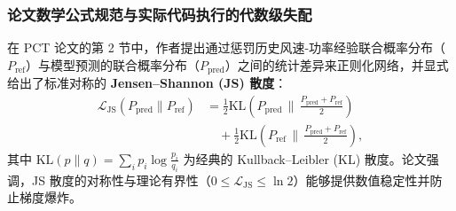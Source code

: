 \subsubsection{论文数学公式规范与实际代码执行的代数级失配}
在 PCT 论文的第 2 节中，作者提出通过惩罚历史风速-功率经验联合概率分布（$P_{\text{ref}}$）与模型预测的联合概率分布（$P_{\text{pred}}$）之间的统计差异来正则化网络，并显式给出了标准对称的 \textbf{Jensen--Shannon (JS) 散度}：
\begin{equation}
\begin{aligned}
\mathcal{L}_{\text{JS}}(P_{\text{pred}} \parallel P_{\text{ref}}) &= \frac{1}{2} \text{KL}\left(P_{\text{pred}} \,\Big\|\, \frac{P_{\text{pred}} + P_{\text{ref}}}{2}\right) \\
&\quad + \frac{1}{2} \text{KL}\left(P_{\text{ref}} \,\Big\|\, \frac{P_{\text{pred}} + P_{\text{ref}}}{2}\right),
\end{aligned}
\label{eq:js_divergence}
\end{equation}
其中 $\text{KL}(p \parallel q) = \sum_i p_i \log \frac{p_i}{q_i}$ 为经典的 Kullback--Leibler (KL) 散度。论文强调，JS 散度的对称性与理论有界性（$0 \le \mathcal{L}_{\text{JS}} \le \ln 2$）能够提供数值稳定性并防止梯度爆炸。

